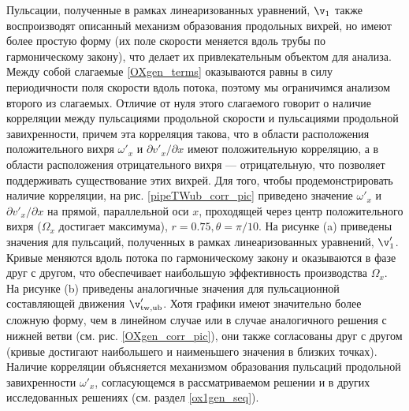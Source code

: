 Пульсации, полученные в рамках линеаризованных уравнений, $\v_1$ также воспроизводят описанный механизм образования продольных вихрей, но имеют более простую форму (их поле скорости меняется вдоль трубы по гармоническому закону), что делает их привлекательным объектом для анализа. Между собой слагаемые \eqref{OXgen_terms} оказываются равны в силу периодичности поля скорости вдоль потока, поэтому мы ограничимся анализом второго из слагаемых. Отличие от нуля этого слагаемого говорит о наличие корреляции между пульсациями продольной скорости и пульсациями продольной завихренности, причем эта корреляция такова, что в области расположения положительного вихря $\omega'_x$ и ${\partial v'_x}/{\partial x}$ имеют положительную корреляцию, а в области расположения отрицательного вихря --- отрицательную, что позволяет поддерживать существование этих вихрей. Для того, чтобы продемонстрировать наличие корреляции, на рис. \ref{pipeTWub_corr_pic} приведено значение $\omega'_x$ и ${\partial v'_x}/{\partial x}$ на прямой, параллельной оси $x$, проходящей через центр положительного вихря ($\Omega_x$ достигает максимума), $r = 0.75, \theta = \pi/10$. На рисунке (a) приведены значения для пульсаций, полученных в рамках линеаризованных уравнений, $\v'_1$. Кривые меняются вдоль потока по гармоническому закону и оказываются в фазе друг с другом, что обеспечивает наибольшую эффективность производства $\Omega_x$. На рисунке (b) приведены аналогичные значения для пульсационной составляющей движения $\v'_\mathrm{tw,ub}$. Хотя графики имеют значительно более сложную форму, чем в линейном случае или в случае аналогичного решения с нижней ветви (см. рис. \ref{OXgen_corr_pic}), они также согласованы друг с другом (кривые достигают наибольшего и наименьшего значения в близких точках). Наличие корреляции объясняется механизмом образования пульсаций продольной завихренности $\omega'_x$, согласующемся в рассматриваемом решении и в других исследованных решениях (см. раздел \ref{ox1gen_seq}). 

